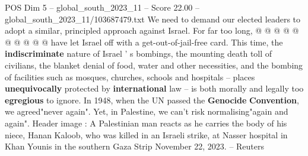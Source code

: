 \begin{textsample}{POS Dim 5 – global\_south\_2023\_11 – Score 22.00 – global\_south\_2023\_11/103687479.txt}
We need to demand our elected leaders to adopt a similar, principled approach against Israel.
For far too long, @ @ @ @ @ @ @ @ @ @ have let Israel off with a get-out-of-jail-free card.
This time, the \textbf{indiscriminate} nature of Israel ' s bombings, the mounting death toll of civilians, the blanket denial of food, water and other necessities, and the bombing of facilities such as mosques, churches, schools and hospitals -- places \textbf{unequivocally} protected by \textbf{international} law -- is both morally and legally too \textbf{egregious} to ignore.
In 1948, when the UN passed the \textbf{Genocide} \textbf{Convention}, we agreed"never again".
Yet, in Palestine, we can't risk normalising"again and again".
Header image : A Palestinian man reacts as he carries the body of his niece, Hanan Kaloob, who was killed in an Israeli strike, at Nasser hospital in Khan Younis in the southern Gaza Strip November 22, 2023. -- Reuters

\end{textsample}

